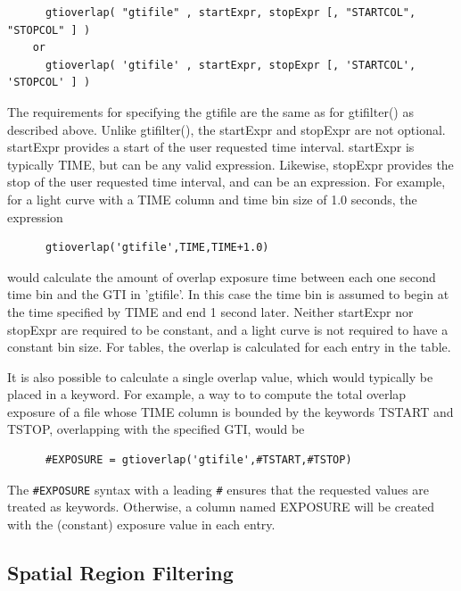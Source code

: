 \documentclass[11pt]{book}
\begin{document}
\begin{verbatim}
      gtioverlap( "gtifile" , startExpr, stopExpr [, "STARTCOL", "STOPCOL" ] )
    or
      gtioverlap( 'gtifile' , startExpr, stopExpr [, 'STARTCOL', 'STOPCOL' ] )
\end{verbatim}

    The requirements for specifying the gtifile are the same as for
    gtifilter() as described above.  Unlike gtifilter(), the startExpr
    and stopExpr are not optional.  startExpr provides a start of the
    user requested time interval.  startExpr is typically TIME, but
    can be any valid expression.  Likewise, stopExpr provides the stop
    of the user requested time interval, and can be an expression.
    For example, for a light curve with a TIME column and time bin
    size of 1.0 seconds, the expression

\begin{verbatim}
      gtioverlap('gtifile',TIME,TIME+1.0)
\end{verbatim}

    would calculate the amount of overlap exposure time between each
    one second time bin and the GTI in 'gtifile'.  In this case the
    time bin is assumed to begin at the time specified by TIME and end
    1 second later.  Neither startExpr nor stopExpr are required to be
    constant, and a light curve is not required to have a constant bin
    size.  For tables, the overlap is calculated for each entry in the
    table.

    It is also possible to calculate a single overlap value, which
    would typically be placed in a keyword.  For example, a way to to
    compute the total overlap exposure of a file whose TIME column is
    bounded by the keywords TSTART and TSTOP, overlapping with the
    specified GTI, would be

\begin{verbatim}
      #EXPOSURE = gtioverlap('gtifile',#TSTART,#TSTOP)
\end{verbatim}

    The \verb+#EXPOSURE+ syntax with a leading \verb+#+ ensures that the
    requested values are treated as keywords.  Otherwise, a column
    named EXPOSURE will be created with the (constant) exposure value
    in each entry.



\subsection{Spatial Region Filtering}
\end{document}
